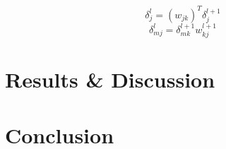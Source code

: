 \documentclass[reprint, english, nofootinbib]{revtex4-2}
\begin{document}
\begin{equation}
    \delta^{l}_j = (w_{jk})^T \delta^{l+1}_j
\end{equation}
\begin{equation}
    \delta^{l}_{mj} = \delta^{l+1}_{mk}w^{l+1}_{kj}
\end{equation}


\section{Results \& Discussion}
\section{Conclusion}

\onecolumngrid

\newpage
\twocolumngrid
\appendix
\end{document}
